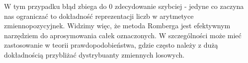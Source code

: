 \documentclass[a4paper,10pt]{article}
\begin{document}
    W tym przypadku błąd zbiega do 0 zdecydowanie szybciej - jedyne co zaczyna nas ograniczać to dokładność reprezentacji liczb w arytmetyce zmiennopozycyjnek. Widzimy więc, że metoda Romberga jest efektywnym narzędziem do aprosymowania całek oznaczonych. W szczególności może mieć zastosowanie w teorii prawdopodobieństwa, gdzie często należy z dużą dokładnością przybliżać dystrybuanty zmiennych losowych. 
   
\end{document}
